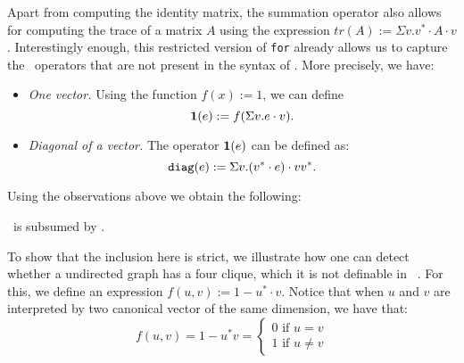 Apart from computing the identity matrix, the summation operator also allows for computing the trace of a matrix $A$ using the expression $tr(A) := \Sigma v. v^*\cdot A \cdot v$. Interestingly enough, this restricted version of \texttt{for} already allows us to capture the \lang\ operators that are not present in the syntax of \langfor. More precisely, we have:
\begin{itemize}
\item {\em One vector.} Using the function $f(x) := 1$, we can define $$\mathbf{1}(e) := f(\Sigma v. e\cdot v).$$
\item {\em Diagonal of a vector.} The operator $\mathbf{1}(e)$ can be defined as:
$$\texttt{diag}(e) := \Sigma v. (v^*\cdot e) \cdot vv^*.$$
\end{itemize}

Using the observations above we obtain the following:
\begin{corollary}
\lang\ is subsumed by \langfor.
\end{corollary}

To show that the inclusion here is strict, we illustrate how one can detect whether a undirected graph has a four clique, which it is not definable in \lang~\cite{BrijderGBW19}. For this, we define an expression $f(u,v) := 1 - u^*\cdot v$. Notice that when $u$ and $v$ are interpreted by two canonical vector of the same dimension, we have that:
\[
  			f(u,v)=1-u^*v=\begin{cases}
               0 \text{ if } u=v \\
               1 \text{ if } u\neq v
            \end{cases}
		\]

